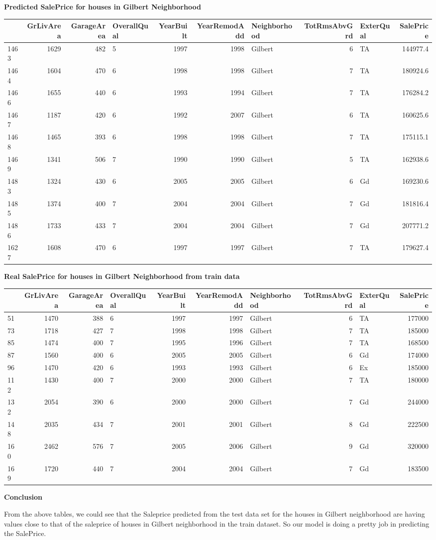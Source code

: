 \documentclass[]{article}
\begin{document}
\textbf{Predicted SalePrice for houses in Gilbert Neighborhood}

\begin{longtable}[]{@{}lrrlrrlrlr@{}}
\toprule
& GrLivArea & GarageArea & OverallQual & YearBuilt & YearRemodAdd &
Neighborhood & TotRmsAbvGrd & ExterQual & SalePrice\tabularnewline
\midrule
\endhead
1463 & 1629 & 482 & 5 & 1997 & 1998 & Gilbert & 6 & TA &
144977.4\tabularnewline
1464 & 1604 & 470 & 6 & 1998 & 1998 & Gilbert & 7 & TA &
180924.6\tabularnewline
1466 & 1655 & 440 & 6 & 1993 & 1994 & Gilbert & 7 & TA &
176284.2\tabularnewline
1467 & 1187 & 420 & 6 & 1992 & 2007 & Gilbert & 6 & TA &
160625.6\tabularnewline
1468 & 1465 & 393 & 6 & 1998 & 1998 & Gilbert & 7 & TA &
175115.1\tabularnewline
1469 & 1341 & 506 & 7 & 1990 & 1990 & Gilbert & 5 & TA &
162938.6\tabularnewline
1483 & 1324 & 430 & 6 & 2005 & 2005 & Gilbert & 6 & Gd &
169230.6\tabularnewline
1485 & 1374 & 400 & 7 & 2004 & 2004 & Gilbert & 7 & Gd &
181816.4\tabularnewline
1486 & 1733 & 433 & 7 & 2004 & 2004 & Gilbert & 7 & Gd &
207771.2\tabularnewline
1627 & 1608 & 470 & 6 & 1997 & 1997 & Gilbert & 7 & TA &
179627.4\tabularnewline
\bottomrule
\end{longtable}

\textbf{Real SalePrice for houses in Gilbert Neighborhood from train
data}

\begin{longtable}[]{@{}lrrlrrlrlr@{}}
\toprule
& GrLivArea & GarageArea & OverallQual & YearBuilt & YearRemodAdd &
Neighborhood & TotRmsAbvGrd & ExterQual & SalePrice\tabularnewline
\midrule
\endhead
51 & 1470 & 388 & 6 & 1997 & 1997 & Gilbert & 6 & TA &
177000\tabularnewline
73 & 1718 & 427 & 7 & 1998 & 1998 & Gilbert & 7 & TA &
185000\tabularnewline
85 & 1474 & 400 & 7 & 1995 & 1996 & Gilbert & 7 & TA &
168500\tabularnewline
87 & 1560 & 400 & 6 & 2005 & 2005 & Gilbert & 6 & Gd &
174000\tabularnewline
96 & 1470 & 420 & 6 & 1993 & 1993 & Gilbert & 6 & Ex &
185000\tabularnewline
112 & 1430 & 400 & 7 & 2000 & 2000 & Gilbert & 7 & TA &
180000\tabularnewline
132 & 2054 & 390 & 6 & 2000 & 2000 & Gilbert & 7 & Gd &
244000\tabularnewline
148 & 2035 & 434 & 7 & 2001 & 2001 & Gilbert & 8 & Gd &
222500\tabularnewline
160 & 2462 & 576 & 7 & 2005 & 2006 & Gilbert & 9 & Gd &
320000\tabularnewline
169 & 1720 & 440 & 7 & 2004 & 2004 & Gilbert & 7 & Gd &
183500\tabularnewline
\bottomrule
\end{longtable}

\textbf{Conclusion}

From the above tables, we could see that the Saleprice predicted from
the test data set for the houses in Gilbert neighborhood are having
values close to that of the saleprice of houses in Gilbert neighborhood
in the train dataset. So our model is doing a pretty job in predicting
the SalePrice.
\end{document}
